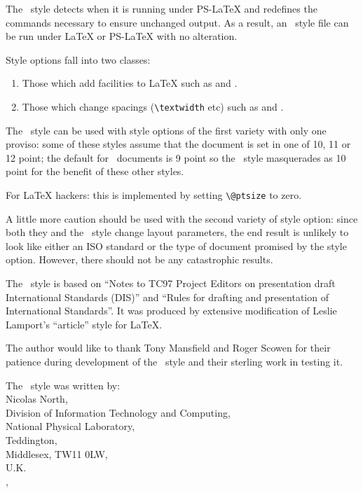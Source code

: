 The \iso\ style detects when it is running under PS-LaTeX and redefines
the commands necessary to ensure unchanged output.
As a result, an \iso\ style file can be run under LaTeX or PS-LaTeX
with no alteration.

Style options fall into two classes:
\begin{enumerate}
\item Those which add facilities to LaTeX such as  and
    .
\item Those which change spacings (\verb|\textwidth| etc) such as
     and .
\end{enumerate}

The \iso\ style can be used with style options of the first variety
with only one proviso: some of these styles assume that the document is
set in one of 10, 11 or 12 point; the default for \iso\ documents is
9 point so the \iso\ style masquerades as 10 point for the benefit of
these other styles.
\begin{note}
For LaTeX hackers: this is implemented by setting \verb|\@ptsize| to
zero.
\end{note}

A little more caution should be used with the second variety of style
option: since both they and the \iso\ style change layout parameters,
the end result is unlikely to look like either an ISO standard or the
type of document promised by the style option.
However, there should not be any catastrophic results.


The \iso\ style is based on ``Notes to TC97 Project Editors on presentation
draft International Standards (DIS)'' and ``Rules for drafting and presentation
of International Standards''.
It was produced by extensive modification of Leslie Lamport's ``article''
style for LaTeX.

The author would like to thank Tony Mansfield and Roger Scowen for their
patience during development of the \iso\ style and their
sterling work in testing it.

The \iso\ style was written by:\\
Nicolas North,\\
Division of Information Technology and Computing,\\
National Physical Laboratory,\\
Teddington,\\
Middlesex, TW11 0LW,\\
U.K.\\
,

